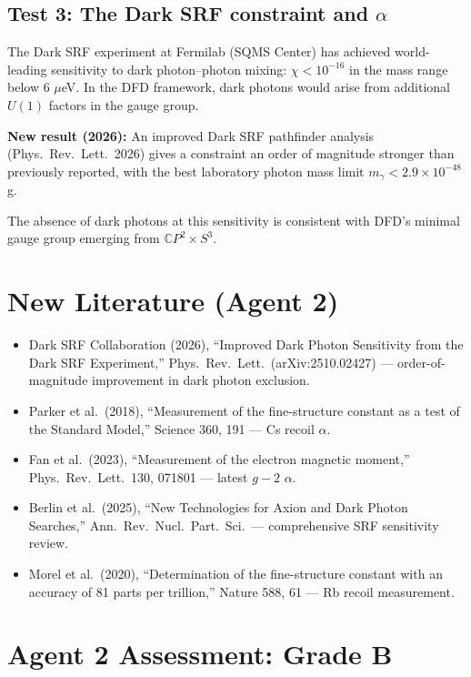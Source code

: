 \documentclass[11pt,a4paper]{article}
\newcommand{\CP}{\mathbb{C}P}
\begin{document}
\subsection{Test 3: The Dark SRF constraint and $\alpha$}

The Dark SRF experiment at Fermilab (SQMS Center) has achieved world-leading sensitivity to dark photon--photon mixing: $\chi < 10^{-16}$ in the mass range below 6 $\mu$eV. In the DFD framework, dark photons would arise from additional $U(1)$ factors in the gauge group.

\textbf{New result (2026):} An improved Dark SRF pathfinder analysis (Phys.\ Rev.\ Lett.\ 2026) gives a constraint an order of magnitude stronger than previously reported, with the best laboratory photon mass limit $m_\gamma < 2.9 \times 10^{-48}$ g.

The absence of dark photons at this sensitivity is consistent with DFD's minimal gauge group emerging from $\CP^2 \times S^3$.

\section{New Literature (Agent 2)}

\begin{itemize}
\item Dark SRF Collaboration (2026), ``Improved Dark Photon Sensitivity from the Dark SRF Experiment,'' Phys.\ Rev.\ Lett.\ (arXiv:2510.02427) --- order-of-magnitude improvement in dark photon exclusion.
\item Parker et al.\ (2018), ``Measurement of the fine-structure constant as a test of the Standard Model,'' Science 360, 191 --- Cs recoil $\alpha$.
\item Fan et al.\ (2023), ``Measurement of the electron magnetic moment,'' Phys.\ Rev.\ Lett.\ 130, 071801 --- latest $g-2$ $\alpha$.
\item Berlin et al.\ (2025), ``New Technologies for Axion and Dark Photon Searches,'' Ann.\ Rev.\ Nucl.\ Part.\ Sci.\ --- comprehensive SRF sensitivity review.
\item Morel et al.\ (2020), ``Determination of the fine-structure constant with an accuracy of 81 parts per trillion,'' Nature 588, 61 --- Rb recoil measurement.
\end{itemize}

\section{Agent 2 Assessment: Grade B}
\end{document}
